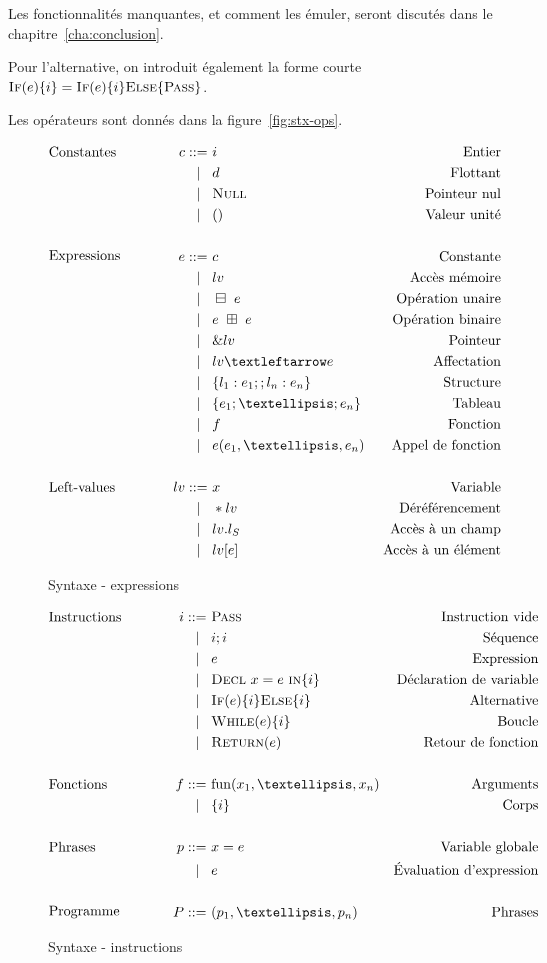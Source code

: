 Les fonctionnalités manquantes, et comment les émuler, seront discutés dans le
chapitre~\ref{cha:conclusion}. %

Pour l'alternative, on introduit également la forme courte $\textsc{If}(e) \{ i \} =
\textsc{If}(e) \{ i \} \textsc{Else} \{ \textsc{Pass} \}$.

Les opérateurs sont donnés dans la figure~\ref{fig:stx-ops}.


\begin{figure}

  \begin{align*}
  \gramdef{Constantes}{c}
                 { i      }{ Entier }
                 { d      }{ Flottant }
                 { \eNull }{ Pointeur nul }
                 { \eUnit }{ Valeur unité }
                 {END}
  \\
  \gramdef{Expressions}{e}
                 { c               }{ Constante }
                 { lv              }{ Accès mémoire }
                 { \opun~e         }{ Opération unaire }
                 { e~\opbin~e      }{ Opération binaire }
                 { \& lv           }{ Pointeur }
                 { lv ← e          }{ Affectation }
                 { \{ l_1 : e_1 ;
                    ; l_n : e_n \} }{ Structure }
                 { \{e_1 ;…; e_n\} }{ Tableau }
                 { f               }{ Fonction }
                 { e (e_1, …, e_n) }{ Appel de fonction }
                 {END}
  \\
  \gramdef{Left-values}{lv}
                  { x      }{ Variable }
                  { *lv    }{ Déréférencement }
                  { lv.l_S }{ Accès à un champ }
                  { lv[e]  }{ Accès à un élément }
                  {END}
  \end{align*}

  \caption{Syntaxe - expressions}
  \label{fig:stx-data}
\end{figure}

\begin{figure}

  \begin{align*}
  \gramdef{Instructions}{i}
                 { \iPass          }{Instruction vide}
                 { i;i             }{Séquence}
                 { e               }{Expression}
                 { \iDecl{x}{e}{i} }{Déclaration de variable}
                 { \iIf{e}{i}{i}   }{Alternative}
                 { \iWhile{e}{i}   }{Boucle}
                 { \iReturn{e}     }{Retour de fonction}
                 {END}
  \\
  \gramdef{Fonctions}{f}
                 { \mathrm{fun} (x_1, …, x_n)    }{Arguments}
                 { \{ i \}                       }{Corps}
                 {END}
  \\
  \gramdef{Phrases}{p}
                 { x = e }{Variable globale}
                 { e     }{Évaluation d'expression}
                 {END}
  \\
  \gramdef{Programme}{P}
                 { (p_1, …, p_n)}{Phrases}
                 {END}
  \end{align*}

  \caption{Syntaxe - instructions}
  \label{fig:stx}
\end{figure}

